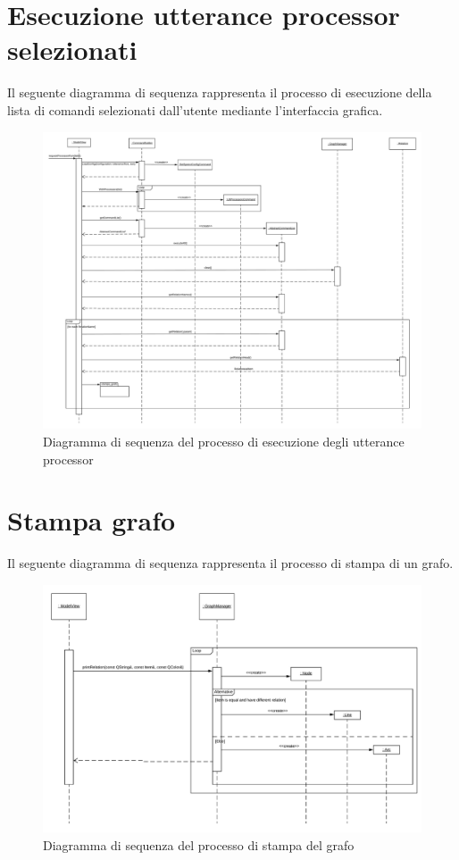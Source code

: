 \documentclass[openany,12pt,a4paper]{report}
\begin{document}
	\section{Esecuzione utterance processor \\ selezionati}
	
	Il seguente diagramma di sequenza rappresenta il processo di esecuzione della lista di comandi selezionati dall'utente mediante l'interfaccia grafica.
	
	\begin{figure}[H]
		\includegraphics[scale=0.37]{EsecuzioneProcessor}
		\centering
		\caption{Diagramma di sequenza del processo di esecuzione degli utterance processor}
	\end{figure}

	\newpage
	
	\section{Stampa grafo}
	
	Il seguente diagramma di sequenza rappresenta il processo di stampa di un grafo.
	
	\begin{figure}[H]
		\includegraphics[scale=0.6]{StampaGrafo}
		\centering
		\caption{Diagramma di sequenza del processo di stampa del grafo}
	\end{figure}
	
\end{document}
